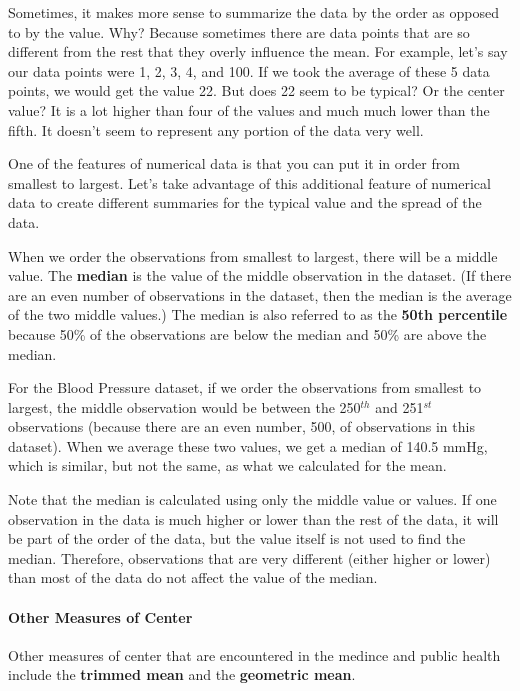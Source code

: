\documentclass[
]{book}
\begin{document}
Sometimes, it makes more sense to summarize the data by the order as opposed to by the value. Why? Because sometimes there are data points that are so different from the rest that they overly influence the mean. For example, let's say our data points were 1, 2, 3, 4, and 100. If we took the average of these 5 data points, we would get the value 22. But does 22 seem to be typical? Or the center value? It is a lot higher than four of the values and much much lower than the fifth. It doesn't seem to represent any portion of the data very well.

One of the features of numerical data is that you can put it in order from smallest to largest. Let's take advantage of this additional feature of numerical data to create different summaries for the typical value and the spread of the data.

When we order the observations from smallest to largest, there will be a middle value. The \textbf{median} is the value of the middle observation in the dataset. (If there are an even number of observations in the dataset, then the median is the average of the two middle values.) The median is also referred to as the \textbf{50th percentile} because 50\% of the observations are below the median and 50\% are above the median.

For the Blood Pressure dataset, if we order the observations from smallest to largest, the middle observation would be between the 250\(^{th}\) and 251\(^{st}\) observations (because there are an even number, 500, of observations in this dataset). When we average these two values, we get a median of 140.5 mmHg, which is similar, but not the same, as what we calculated for the mean.

Note that the median is calculated using only the middle value or values. If one observation in the data is much higher or lower than the rest of the data, it will be part of the order of the data, but the value itself is not used to find the median. Therefore, observations that are very different (either higher or lower) than most of the data do not affect the value of the median.

\hypertarget{other-measures-of-center}{%
\paragraph{Other Measures of Center}\label{other-measures-of-center}}

Other measures of center that are encountered in the medince and public health include the \textbf{trimmed mean} and the \textbf{geometric mean}.
\end{document}
